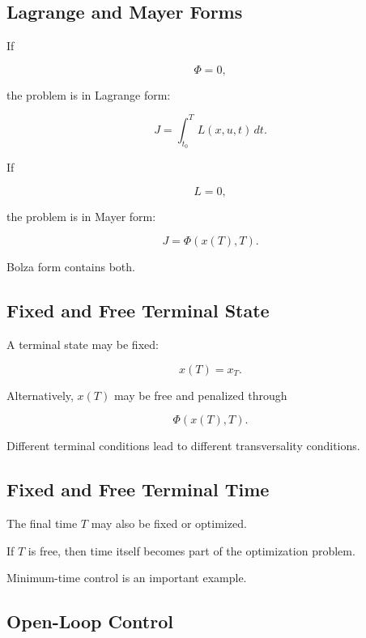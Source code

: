 \subsection{Lagrange and Mayer Forms}
\label{subsec:lagrange-mayer-forms}

If

\[
\Phi=0,
\]

the problem is in Lagrange form:

\[
\boxed{
J
=
\int_{t_0}^{T}
L(x,u,t)\,dt.
}
\]

If

\[
L=0,
\]

the problem is in Mayer form:

\[
\boxed{
J
=
\Phi(x(T),T).
}
\]

Bolza form contains both.

\subsection{Fixed and Free Terminal State}
\label{subsec:fixed-free-terminal-state}

A terminal state may be fixed:

\[
\boxed{
x(T)=x_T.
}
\]

Alternatively, \(x(T)\) may be free and penalized through

\[
\Phi(x(T),T).
\]

Different terminal conditions lead to different transversality conditions.

\subsection{Fixed and Free Terminal Time}
\label{subsec:fixed-free-terminal-time}

The final time \(T\) may also be fixed or optimized.

If \(T\) is free, then time itself becomes part of the optimization
problem.

Minimum-time control is an important example.

\subsection{Open-Loop Control}
\label{subsec:open-loop-control}

